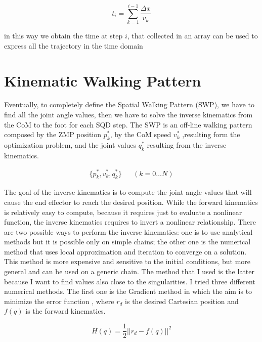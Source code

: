 \documentclass[a4paper]{article}
\begin{document}
\begin{equation}
t_i = \sum_{k=1}^{i-1}{\frac{\Delta x}{v_k}}
\label{eq:st_conversion}
\end{equation}

in this way we obtain the time at step $i$, that collected in an array can be used to express all the trajectory in the time domain



 
\section{Kinematic Walking Pattern}
\label{sec:KWP}

Eventually, to completely define the Spatial Walking Pattern (SWP), we have to find all the joint angle values, then we have to solve the inverse kinematics from the CoM to the foot for each SQD step.  The SWP is an off-line walking pattern composed by the ZMP position $p_k^*$, by the CoM speed $v_k^*$ ,resulting form the optimization problem, and the joint values $q_k^*$ resulting from the inverse kinematics.

\begin{equation}
\begin{aligned}
\{p_k^*, v_k^*, q_k^*\} && (k=0\dots N) 
\end{aligned}
\label{eq:SWP}
\end{equation}

The goal of the inverse kinematics is to compute the joint angle values that will cause the end effector to reach the desired position.
While the forward kinematics is relatively easy to compute, because it requires just to evaluate a nonlinear function, the inverse kinematics requires to invert a nonlinear relationship. There are two possible ways to perform the inverse kinematics: one is to use analytical methods but it is possible only on simple chains; the other one is the numerical method that uses local approximation and iteration to converge on a solution. This method is more expensive and sensitive to the initial conditions, but more general and can be used on a generic chain. The method that I used is the latter because I want to find values also close to the singularities. I tried three different numerical methods. The first one is the Gradient method in which the aim is to minimize the error function %
, where $r_d$ is the desired Cartesian position and $f(q)$ is the forward kinematics.


\begin{equation}
H(q) = \frac{1}{2}||r_d-f(q)||^2
\label{eq:gradient_cost}
\end{equation}
\end{document}

